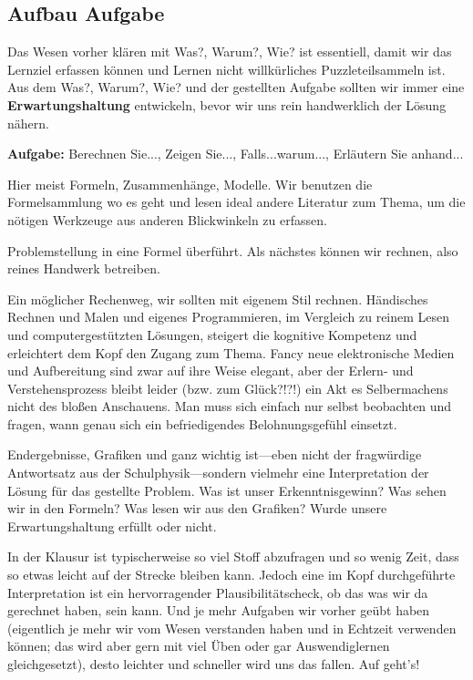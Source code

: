 \subsection*{Aufbau Aufgabe}
\begin{Ziel}
Das Wesen vorher klären mit Was?, Warum?, Wie? ist essentiell, damit wir das
Lernziel erfassen können und Lernen nicht willkürliches Puzzleteilsammeln ist.
Aus dem Was?, Warum?, Wie? und der gestellten Aufgabe sollten wir immer eine
\textbf{Erwartungshaltung} entwickeln, bevor wir uns rein handwerklich der Lösung nähern.
\end{Ziel}
\textbf{Aufgabe:} Berechnen Sie..., Zeigen Sie..., Falls...warum..., Erläutern
Sie anhand...
\begin{Werkzeug}
Hier meist Formeln, Zusammenhänge, Modelle. Wir benutzen die Formelsammlung
wo es geht und lesen ideal andere Literatur zum Thema, um die nötigen Werkzeuge
aus anderen Blickwinkeln zu erfassen.
\end{Werkzeug}
\begin{Ansatz}
Problemstellung in eine Formel überführt. Als nächstes können wir rechnen, also
reines Handwerk betreiben.
\end{Ansatz}
\begin{ExCalc}
Ein möglicher Rechenweg, wir sollten mit eigenem Stil
rechnen.
Händisches Rechnen und Malen und eigenes Programmieren, im Vergleich zu reinem Lesen und computergestützten Lösungen,
steigert die kognitive Kompetenz und erleichtert dem Kopf den Zugang zum Thema.
%
Fancy neue elektronische Medien und Aufbereitung sind zwar auf ihre Weise elegant, aber der Erlern- und Verstehensprozess bleibt leider (bzw. zum Glück?!?!) ein Akt es Selbermachens nicht des bloßen Anschauens.
%
Man muss sich einfach nur selbst beobachten und fragen, wann genau sich ein befriedigendes Belohnungsgefühl einsetzt.
%
\end{ExCalc}
\begin{Loesung}
Endergebnisse, Grafiken und ganz wichtig ist---eben nicht der fragwürdige Antwortsatz
aus der Schulphysik---sondern vielmehr eine Interpretation der Lösung
für das gestellte Problem. Was ist unser Erkenntnisgewinn? Was sehen wir in den
Formeln? Was lesen wir aus den Grafiken? Wurde unsere Erwartungshaltung erfüllt
oder nicht.

In der Klausur ist typischerweise so viel Stoff abzufragen und so wenig Zeit,
dass so etwas leicht auf der Strecke bleiben kann. Jedoch eine im Kopf
durchgeführte Interpretation ist ein hervorragender Plausibilitätscheck, ob das was
wir da gerechnet haben, sein kann. Und je mehr Aufgaben wir
vorher geübt haben (eigentlich je mehr wir vom Wesen verstanden haben und in
Echtzeit verwenden können; das wird aber gern mit viel Üben oder gar
Auswendiglernen gleichgesetzt),
desto leichter und schneller wird uns das fallen.
%
Auf geht's!
\end{Loesung}
